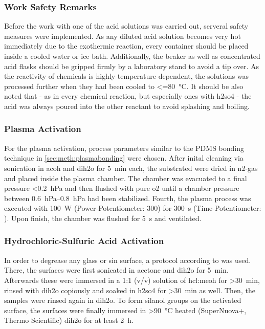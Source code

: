 \subsubsection{Work Safety Remarks}
Before the work with one of the acid solutions was carried out, serveral safety measures were implemented. As any diluted acid solution becomes very hot immediately due to the exothermic reaction, every container should be placed inside a cooled water or ice bath. Additionally, the beaker as well as concentrated acid flasks should be gripped firmly by a laboratory stand to avoid a tip over. As the reactivity of chemicals is highly temperature-dependent, the solutions was processed further when they had been cooled to \SI{<=80}{\degreeCelsius}. It should be also noted that - as in every chemical reaction, but especially ones with \gls{h2so4} - the acid was always poured into the other reactant to avoid splashing and boiling.

\subsubsection{Plasma Activation}
For the plasma activation, process parameters similar to the PDMS bonding technique in \ref{sec:meth:plasmabonding} were chosen. After inital cleaning via sonication in \gls{acoh} and \gls{dih2o} for \SI{5}{\minute} each, the substrated were dried in \gls{n2}-gas and placed inside the plasma chamber. The chamber was evacuated to a final pressure <\SI{0.2}{\hecto\pascal} and then flushed with pure \gls{o2} until a chamber pressure between \SIrange{0.6}{0.8}{\hecto\pascal} had been stabilized. Fourth, the plasma process was executed with \SI{100}{\watt} (Power-Potentiometer: 300) for \SI{300}{\second} (Time-Potentiometer: %
). Upon finish, the chamber was flushed for \SI{5}{\second} and ventilated.

\subsubsection{Hydrochloric-Sulfuric Acid Activation}
In order to degrease any glass or \gls{sin} surface, a protocol according to \citet{lit:chem:Dressick} was used. There, the surfaces were first sonicated in acetone and \gls{dih2o}  for \SI{5}{\minute}. Afterwards these were immersed in a 1:1 (v/v) solution of \gls{hcl}:\gls{meoh} for \SI{>30}{\minute}, rinsed with \gls{dih2o} copiously and soaked in \gls{h2so4} for \SI{>30}{\minute} as well. Then, the samples were rinsed again in \acrlong{dih2o}. To form silanol groups on the activated surface, the surfaces were finally immersed in \SI{>90}{\degreeCelsius} heated (SuperNuova+, Thermo Scientific) \gls{dih2o}  for at least \SI{2}{\hour}.
